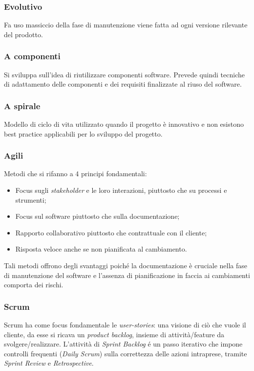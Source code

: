 		\subsubsection{Evolutivo}
			Fa uso massiccio della fase di manutenzione viene fatta ad ogni versione rilevante del prodotto.
		
		\subsubsection{A componenti}
			Si sviluppa sull'idea di riutilizzare componenti software. Prevede quindi tecniche di adattamento delle componenti e dei requisiti finalizzate al riuso del software.
		
		\subsubsection{A spirale}	
				Modello di ciclo di vita utilizzato quando il progetto è innovativo e non esistono best practice applicabili per lo sviluppo del progetto.
		
		\subsubsection{Agili}
		Metodi che si rifanno a 4 principi fondamentali:
			\begin{itemize}  
			\item Focus sugli \emph{stakeholder} e le loro interazioni, piuttosto che su processi e strumenti;
			\item Focus sul software piuttosto che sulla documentazione;
			\item Rapporto collaborativo piuttosto che contrattuale con il cliente;
			\item Risposta veloce anche se non pianificata al cambiamento. 
			\end{itemize}				
		Tali metodi offrono degli svantaggi poiché la documentazione è cruciale nella fase di manutenzione del software e l'assenza di pianificazione in faccia ai cambiamenti comporta dei rischi.
		
			\subsubsection{Scrum}
				Scrum ha come focus fondamentale le  \emph{user-stories}: una visione di ciò che vuole il cliente, da esse si ricava un \emph{product backlog}, insieme di attività/feature da svolgere/realizzare. L'attività di \emph{Sprint Backlog} é un passo iterativo che impone controlli frequenti (\emph{Daily Scrum}) sulla correttezza delle azioni intraprese, tramite \emph{Sprint Review} e \emph{Retrospective}.\newpage

